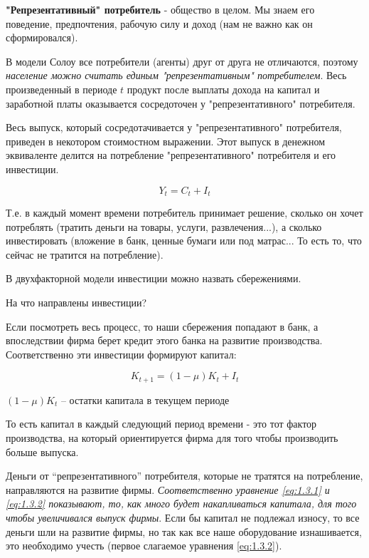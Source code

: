 \documentclass[reqno]{article}
\theoremstyle{definition}
\theoremstyle{definition}
\theoremstyle{definition}
\theoremstyle{definition}
\theoremstyle{definition}
\theoremstyle{definition}
\theoremstyle{definition}
\theoremstyle{definition}
\theoremstyle{definition}
\begin{document}
	\textbf{"Репрезентативный" потребитель} - общество в целом. Мы знаем его поведение, предпочтения, рабочую силу и доход (нам не важно как он сформировался).
	
	В модели Солоу все потребители (агенты) друг от друга не отличаются, поэтому \emph{население можно считать единым "репрезентативным" потребителем}. Весь произведенный в периоде $t$ продукт после выплаты дохода на капитал и заработной платы оказывается сосредоточен у "репрезентативного" потребителя.
	
	Весь выпуск, который сосредотачивается у "репрезентативного" потребителя, приведен в некотором стоимостном выражении. Этот выпуск в денежном эквиваленте делится на потребление "репрезентативного" потребителя и его инвестиции.
	
	\begin{equation}\label{eq:1.3.1}
		Y_t = C_t + I_t
	\end{equation}
	
	Т.е. в каждый момент времени потребитель принимает решение, сколько он хочет потреблять (тратить деньги на товары, услуги, развлечения...), а сколько инвестировать (вложение в банк, ценные бумаги или под матрас... То есть то, что сейчас не тратится на потребление).
	
	В двухфакторной модели инвестиции можно назвать сбережениями.\bigskip
	
	На что направлены инвестиции? 
	
	Если посмотреть весь процесс, то наши сбережения попадают в банк, а впоследствии фирма берет кредит этого банка на развитие производства. Соответственно эти инвестиции формируют капитал:
	
	\begin{equation}\label{eq:1.3.2}
		K_{t+1} = (1 - \mu) K_t + I_t
	\end{equation}

	$(1 - \mu) K_t$ -- остатки капитала в текущем периоде
	
	То есть капитал в каждый следующий период времени - это тот фактор производства, на который ориентируется фирма для того чтобы производить больше выпуска.
	
	Деньги от ``репрезентативного'' потребителя, которые не тратятся на потребление, направляются на развитие фирмы.  \emph{Соответственно уравнение \ref{eq:1.3.1} и \ref{eq:1.3.2} показывают, то, как много будет накапливаться капитала, для того чтобы увеличивался выпуск фирмы}. Если бы капитал не подлежал износу, то все деньги шли на развитие фирмы, но так как все наше оборудование изнашивается, это необходимо учесть (первое слагаемое уравнения \ref{eq:1.3.2}).
	
\end{document}
